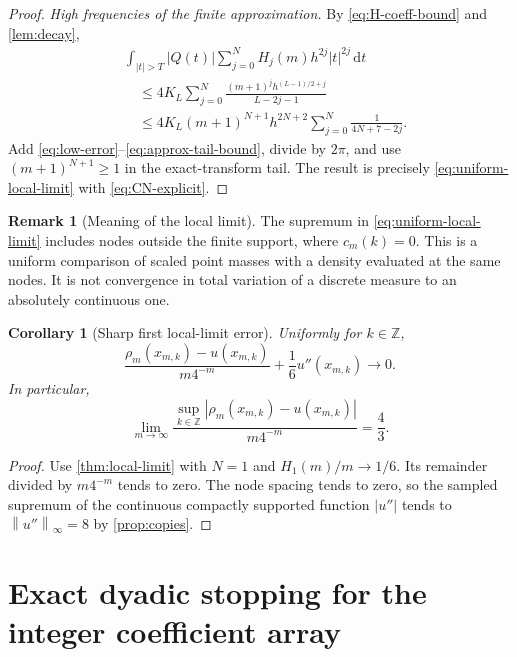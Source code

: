 \documentclass[11pt,a4paper]{article}
\numberwithin{equation}{section}
\newtheorem{corollary}[corollary]{Corollary}
\theoremstyle{definition}
\newtheorem{remark}[remark]{Remark}
\newcommand{\Z}{\mathbb Z}
\newcommand{\dd}{\,\mathrm d}
\newcommand{\norm}[1]{\left\lVert #1\right\rVert}
\begin{document}
\begin{proof}
\emph{High frequencies of the finite approximation.}
By \eqref{eq:H-coeff-bound} and \cref{lem:decay},
\begin{align}
 &\int_{|t|>T}|Q(t)|\sum_{j=0}^NH_j(m)h^{2j}|t|^{2j}\dd t\nonumber\\
 &\quad\leq4K_L\sum_{j=0}^N
       \frac{(m+1)^jh^{(L-1)/2+j}}{L-2j-1}\nonumber\\
 &\quad\leq4K_L(m+1)^{N+1}h^{2N+2}
          \sum_{j=0}^N\frac1{4N+7-2j}.
 \label{eq:approx-tail-bound}
\end{align}
Add \eqref{eq:low-error}--\eqref{eq:approx-tail-bound}, divide by
$2\pi$, and use $(m+1)^{N+1}\geq1$ in the exact-transform tail.
The result is precisely \eqref{eq:uniform-local-limit} with
\eqref{eq:CN-explicit}.
\end{proof}

\begin{remark}[Meaning of the local limit]
The supremum in \eqref{eq:uniform-local-limit} includes nodes outside
the finite support, where $c_m(k)=0$. This is a uniform comparison
of scaled point masses with a density evaluated at the same nodes.
It is not convergence in total variation of a discrete measure to
an absolutely continuous one.
\end{remark}

\begin{corollary}[Sharp first local-limit error]\label{cor:local-sharp}
Uniformly for $k\in\Z$,
\begin{equation}
 \frac{\rho_m(x_{m,k})-u(x_{m,k})}{m4^{-m}}
       +\frac16u''(x_{m,k})\longrightarrow0.
 \label{eq:normalized-lattice-error}
\end{equation}
In particular,
\begin{equation}
 \lim_{m\to\infty}
 \frac{\sup_{k\in\Z}|\rho_m(x_{m,k})-u(x_{m,k})|}{m4^{-m}}
 =\frac43.
 \label{eq:lattice-sharp-constant}
\end{equation}
\end{corollary}
\begin{proof}
Use \cref{thm:local-limit} with $N=1$ and
$H_1(m)/m\to1/6$. Its remainder divided by $m4^{-m}$ tends to
zero. The node spacing tends to zero, so the sampled supremum of
the continuous compactly supported function $|u''|$ tends to
$\norm{u''}_\infty=8$ by \cref{prop:copies}.
\end{proof}

\section{Exact dyadic stopping for the integer coefficient array}\label{sec:dyadic-lattice}
\end{document}
